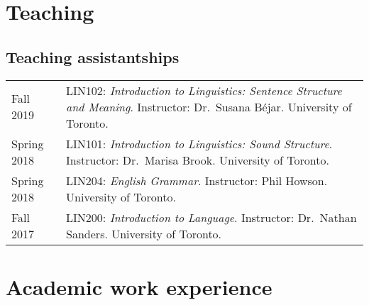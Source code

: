 \documentclass[letterpaper]{article}
\begin{document}
\section*{Teaching}

\subsection*{Teaching assistantships}

\begin{tabular}{p{}p{}}
    Fall 2019 & LIN102: \emph{Introduction to Linguistics: Sentence Structure
    and Meaning}. Instructor: Dr.~Susana B\'ejar. University of Toronto. \\
    Spring 2018 & LIN101: \emph{Introduction to Linguistics: Sound Structure}.
    Instructor: Dr.~Marisa Brook. University of Toronto. \\
    Spring 2018 & LIN204: \emph{English Grammar}. Instructor: Phil Howson.
    University of Toronto. \\
    Fall 2017 & LIN200: \emph{Introduction to Language}. Instructor: Dr.~Nathan
    Sanders. University of Toronto. \\
\end{tabular}


\section*{Academic work experience}
\end{document}
